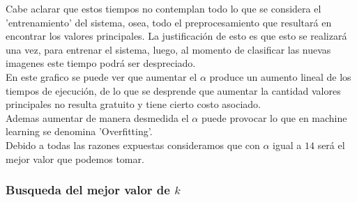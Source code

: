 Cabe aclarar que estos tiempos no contemplan todo lo que se considera el 'entrenamiento' del sistema, osea, todo el preprocesamiento que resultará en encontrar los valores principales. La justificación de esto es que esto se realizará una vez, para entrenar el sistema, luego, al momento de clasificar las nuevas imagenes este tiempo podrá ser despreciado.
\\
En este grafico se puede ver que aumentar el $\alpha$ produce un aumento lineal de los tiempos de ejecución, de lo que se desprende que aumentar la cantidad valores principales no resulta gratuito y tiene cierto costo asociado.
\\
Ademas aumentar de manera desmedida el $\alpha$ puede provocar lo que en machine learning se denomina 'Overfitting'.
\inventarReferencia
\\
Debido a todas las razones expuestas consideramos que con $\alpha$ igual a $14$ será el mejor valor que podemos tomar.
\\
\subsubsection{Busqueda del mejor valor de $k$}

